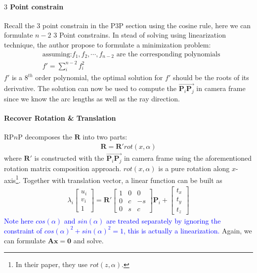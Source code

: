 \documentclass[a4paper]{article}
\begin{document}
\paragraph{$3$ Point constrain}
Recall the $3$ point constrain in the P$3$P section using the cosine rule, here we can formulate $n-2$ $3$ Point constrains. In stead of solving using linearization technique, the author propose to formulate a minimization problem:
\begin{align*}
&\text{assuming:$f_1,f_2,\cdots,f_{n-2}$ are the corresponding polynomials} \\
& f' = \sum_{i}^{n-2} f_i^2
\end{align*}
$f'$ is a $8^{th}$ order polynomial, the optimal solution for $f'$ should be the roots of its derivative. The solution can now be used to compute the $\overrightarrow{\mathbf{P}_i\mathbf{P}_j}$ in camera frame since we know the arc lengths as well as the ray direction.
\paragraph{Recover Rotation \& Translation}
RP$n$P decomposes the $\mathbf{R}$ into two parts:
\begin{align*}
\mathbf{R}=\mathbf{R}'rot(x,\alpha)
\end{align*}
where $\mathbf{R}'$ is constructed with the $\overrightarrow{\mathbf{P}_i\mathbf{P}_j}$ in camera frame using the aforementioned rotation matrix composition approach. $rot(x,\alpha)$ is a pure rotation along $x$-axis\footnote{In their paper, they use $rot(z,\alpha)$.}. Together with translation vector, a linear function can be built as
\begin{align*}
\lambda_i \left[ 
\begin{matrix}
u_i \\ v_i \\ 1
\end{matrix}
\right]=\mathbf{R}'\left[ 
\begin{matrix}
1 & 0 & 0 \\ 0 & c & -s \\ 0 & s & c
\end{matrix}
\right]\mathbf{P}_i+\left[ 
\begin{matrix}
t_x \\ t_y \\ t_z
\end{matrix}
\right]
\end{align*}
\textcolor{blue}{Note here $cos(\alpha)$ and $sin(\alpha)$ are treated separately by ignoring the constraint of $cos(\alpha)^2+sin(\alpha)^2=1$, this is actually a linearization.} Again, we can formulate $\mathbf{Ax}=\mathbf{0}$ and solve. 
\end{document}
